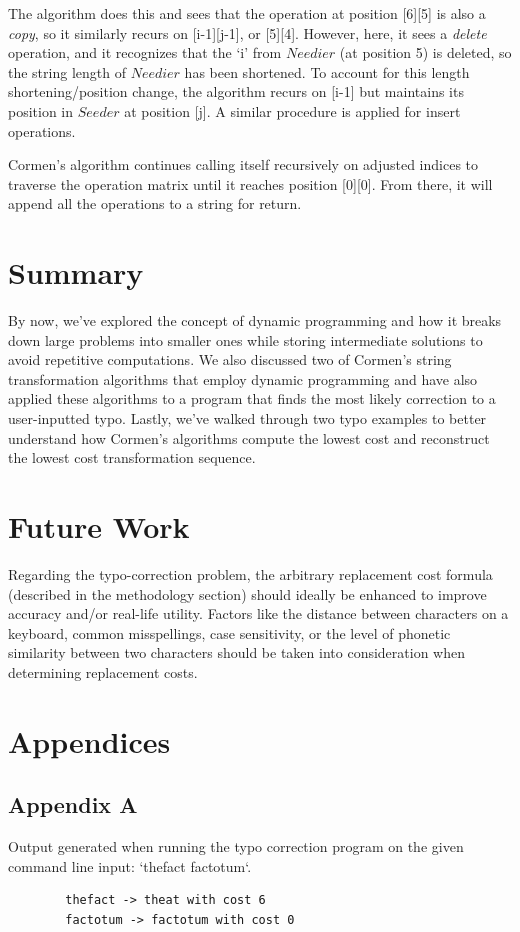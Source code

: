 \documentclass[12pt,letterpaper]{article}
\begin{document}
The algorithm does this and sees that the operation at position [6][5] is also a \textit{copy}, so it similarly recurs on [i-1][j-1], or [5][4]. However, here, it sees a \textit{delete} operation, and it recognizes that the ‘i’ from $Needier$ (at position 5) is deleted, so the string length of $Needier$ has been shortened. To account for this length shortening/position change, the algorithm recurs on [i-1] but maintains its position in $Seeder$ at position [j]. A similar procedure is applied for insert operations.

Cormen’s algorithm continues calling itself recursively on adjusted indices to traverse the operation matrix until it reaches position [0][0]. From there, it will append all the operations to a string for return.

\section{Summary}
By now, we’ve explored the concept of dynamic programming and how it breaks down large problems into smaller ones while storing intermediate solutions to avoid repetitive computations. We also discussed two of Cormen’s string transformation algorithms that employ dynamic programming and have also applied these algorithms to a program that finds the most likely correction to a user-inputted typo. Lastly, we’ve walked through two typo examples to better understand how Cormen’s algorithms compute the lowest cost and reconstruct the lowest cost transformation sequence.

\section{Future Work}
Regarding the typo-correction problem, the arbitrary replacement cost formula (described in the methodology section) should ideally be enhanced to improve accuracy and/or real-life utility. Factors like the distance between characters on a keyboard, common misspellings, case sensitivity, or the level of phonetic similarity between two characters should be taken into consideration when determining replacement costs.

  \printbibliography

\pagebreak
\section*{Appendices}
\subsection*{Appendix A}
    Output generated when running the typo correction program on the given command line input: `thefact factotum`.
    \begin{footnotesize}
        \begin{verbatim}
        thefact -> theat with cost 6
        factotum -> factotum with cost 0
        \end{verbatim}
    \end{footnotesize}
    
\end{document}
